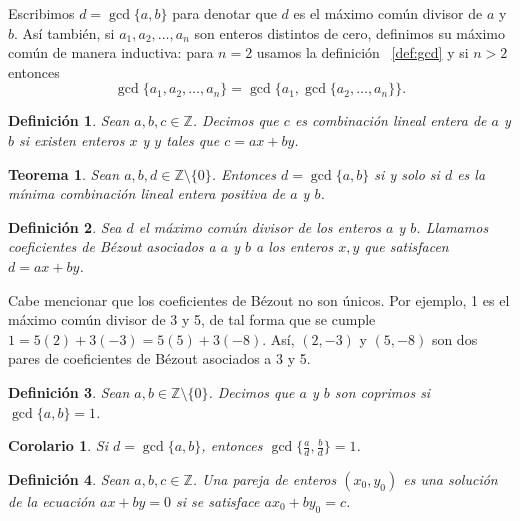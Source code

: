 \documentclass[11pt]{article}
\newtheorem{definition}{Definición}
\newtheorem{theorem}{Teorema}
\newtheorem{corollary}{Corolario}
\begin{document}
Escribimos $d = \gcd\lbrace a, b\rbrace$ para denotar que $d$ es el máximo común divisor de $a$ y $b$. Así
también, si $a_1, a_2, \ldots, a_n$ son enteros distintos de cero, definimos su máximo común
de manera inductiva: para $n = 2$ usamos la definición ~\ref{def:gcd} y si $n > 2$ entonces
\begin{equation*}
	\gcd\lbrace a_1, a_2, \ldots, a_n\rbrace = \gcd\lbrace a_1, \gcd\lbrace a_2, \ldots,
	a_n\rbrace\rbrace.
\end{equation*}

\begin{definition}
	Sean $a, b, c \in \mathbb{Z}$. Decimos que $c$ es combinación lineal entera de $a$ y $b$ si
	existen enteros $x$ y $y$ tales que $c = ax + by$.
\end{definition}

\begin{theorem}
	Sean $a, b, d \in \mathbb{Z}\setminus\lbrace 0 \rbrace$. Entonces $d = \gcd\lbrace a, b \rbrace$
	si y solo si $d$ es la mínima combinación lineal entera positiva de $a$ y $b$.
\end{theorem}

\begin{definition}
	Sea $d$ el máximo común divisor de los enteros $a$ y $b$. Llamamos coeficientes de Bézout
	asociados a $a$ y $b$ a los enteros $x, y$ que satisfacen $d = ax + by$.
\end{definition}

Cabe mencionar que los coeficientes de Bézout no son únicos. Por ejemplo, 1 es el máximo común
divisor de 3 y 5, de tal forma que se cumple $1 = 5(2) + 3(-3) = 5(5) + 3(-8)$. Así, $(2, -3)$ y
$(5, -8)$ son dos pares de coeficientes de Bézout asociados a 3 y 5.

\begin{definition}
	Sean $a, b \in \mathbb{Z}\setminus\lbrace 0 \rbrace$. Decimos que $a$ y $b$ son coprimos si
	$\gcd\lbrace a, b \rbrace = 1$.
\end{definition}

\begin{corollary}
	\label{cor:gcd}
	Si $d = \gcd\lbrace a, b\rbrace$, entonces $\gcd\lbrace \frac{a}{d}, \frac{b}{d} \rbrace = 1$.
\end{corollary}

\begin{definition}
	Sean $a, b, c \in \mathbb{Z}$. Una pareja de enteros $(x_0, y_0)$ es una solución de la ecuación
	$ax + by = 0$ si se satisface $ax_0 + by_0 = c$.
\end{definition}
\end{document}
